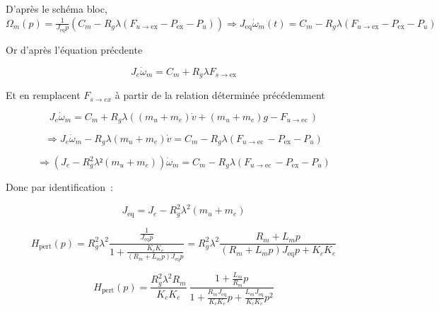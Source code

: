 \ifprof
\begin{texteCache}

 D'après le schéma bloc,
  \(\Omega_{m}\left( p \right) = \frac{1}{J_{\text{eq}}p}\left( C_{m} - R_{g}\lambda\left( F_{u \rightarrow \text{ex}} - P_{\text{ex}} - P_{u} \right) \right) \Rightarrow J_{\text{eq}}{\dot{\omega}}_{m}\left( t \right) = C_{m} - R_{g}\lambda\left( F_{u \rightarrow \text{ex}} - P_{\text{ex}} - P_{u} \right)\)

  Or d'après l'équation précdente


\[J_{e}{\dot{\omega}}_{m} = C_{m} + R_{g}\lambda F_{s \rightarrow \text{ex}}\]

Et en remplacent \(F_{s \rightarrow ex}\) à partir de la relation déterminée précédemment

\[J_{e}{\dot{\omega}}_{m} = C_{m} + R_{g}\lambda\left( \left( m_{u} + m_{e} \right)\dot{v} + \left( m_{u} + m_{e} \right)g - F_{u \rightarrow \text{ec}\ } \right)\]

\[\Rightarrow J_{e}{\dot{\omega}}_{m} - R_{g}\lambda\left( m_{u} + m_{e} \right)\dot{v} = C_{m} - R_{g}\lambda\left( F_{u \rightarrow \text{ec}\ } - P_{\text{ex}} - P_{u} \right)\]

\[\Rightarrow \left( J_{e} - R_{g}^{2}\lambda ²\left( m_{u} + m_{e} \right) \right){\dot{\omega}}_{m} = C_{m} - R_{g}\lambda\left( F_{u \rightarrow \text{ec}\ } - P_{\text{ex}} - P_{u} \right)\]

Donc par identification~:

\[J_{\text{eq}} = J_{e} - R_{g}^{2}\lambda ^2\left( m_{u} + m_{e} \right)\]
 
 \vspace{1.5cm}

\end{texteCache}
\else


\fi


\ifprof
\begin{texteCache}

\[H_{\text{pert}}\left( p \right) = R_{g}^{2}\lambda^{2}\frac{\frac{1}{J_{\text{eq}}p}}{1 + \frac{K_{c}K_{e}}{\left( R_{m} + L_{m}p \right)J_{\text{eq}}p}} = R_{g}^{2}\lambda^{2}\frac{R_{m} + L_{m}p}{\left( R_{m} + L_{m}p \right)J_{\text{eq}}p + K_{c}K_{e}}\]

\[H_{\text{pert}}\left( p \right) = \frac{R_{g}^{2}\lambda^{2}R_{m}}{K_{c}K_{e}}\ \frac{1 + \frac{L_{m}}{R_{m}}p}{1 + \frac{R_{m}J_{\text{eq}}}{K_{c}K_{e}}p + \frac{L_{m}J_{\text{eq}}}{K_{c}K_{e}}p^{2}}\]


 
 \vspace{1.5cm}

\end{texteCache}
\else




